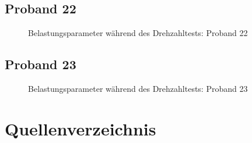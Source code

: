 \documentclass[
  letterpaper,
  DIV=11]{scrartcl}
\begin{document}
\subsection{Proband 22}

\begin{figure}


\caption{\label{fig-DT_22}Belastungsparameter während des Drehzahltests:
Proband 22}

\end{figure}%

\subsection{Proband 23}

\begin{figure}


\caption{\label{fig-DT_23}Belastungsparameter während des Drehzahltests:
Proband 23}

\end{figure}%

\section{Quellenverzeichnis}\label{quellenverzeichnis}
\end{document}
